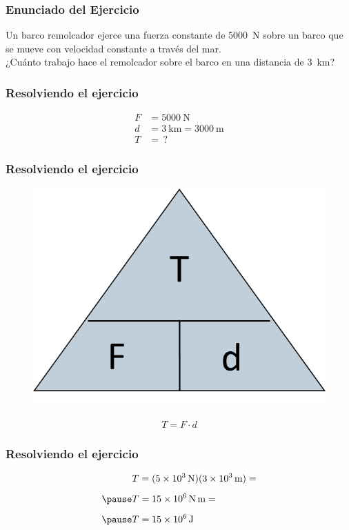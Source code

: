 \documentclass[14pt]{beamer}
\begin{document}
\begin{frame}
\frametitle{Enunciado del Ejercicio}
Un barco remolcador ejerce una fuerza constante de \SI{5000}{\newton} sobre un barco que se mueve con  velocidad constante a través del mar.
\\
\bigskip
\pause
¿Cuánto trabajo hace el remolcador sobre el barco en una distancia de \SI{3}{\kilo\meter}?
\end{frame}
\begin{frame}
\frametitle{Resolviendo el ejercicio}
\pause
\begin{align*}
F &= \SI{5000}{\newton} \\[0.5em]
d &= \SI{3}{\kilo\meter} = \SI{3000}{\meter} \\[0.5cm]
T &= \, ?
\end{align*}
\end{frame}
\begin{frame}
\frametitle{Resolviendo el ejercicio}
\begin{figure}
    \centering
    \includegraphics[scale=0.75]{Imagenes/Triangulo_Trabajo.png}
\end{figure}
\pause
\begin{align*}
T = F \cdot d
\end{align*}
\end{frame}
\begin{frame}
\frametitle{Resolviendo el ejercicio}
\begin{eqnarray*}
\begin{aligned}
T &= (\SI{5d3}{\newton})(\SI{3d3}{\meter}) = \\[0.5em] \pause 
T &= \SI{15d6}{\newton\meter} = \\[0.5em] \pause 
T &= \SI{15d6}{\joule} 
\end{aligned}
\end{eqnarray*}
\end{frame}
\end{document}
